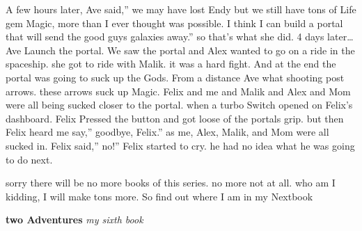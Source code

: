 \documentclass[12pt,oneside]{krantz}
\begin{document}
A few hours later, Ave said,'' we may have lost Endy but we still have
tons of Life gem Magic, more than I ever thought was possible. I think I
can build a portal that will send the good guys galaxies away.'' so
that's what she did. 4 days later\ldots{} Ave Launch the portal. We saw
the portal and Alex wanted to go on a ride in the spaceship. she got to
ride with Malik. it was a hard fight. And at the end the portal was
going to suck up the Gods. From a distance Ave what shooting post
arrows. these arrows suck up Magic. Felix and me and Malik and Alex and
Mom were all being sucked closer to the portal. when a turbo Switch
opened on Felix's dashboard. Felix Pressed the button and got loose of
the portals grip. but then Felix heard me say,'' goodbye, Felix.'' as
me, Alex, Malik, and Mom were all sucked in. Felix said,'' no!'' Felix
started to cry. he had no idea what he was going to do next.

sorry there will be no more books of this series. no more not at all.
who am I kidding, I will make tons more. So find out where I am in my
Nextbook

\textbf{two Adventures} \emph{my sixth book}
\end{document}
